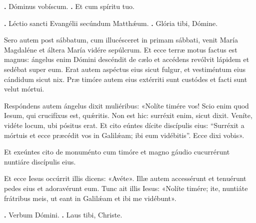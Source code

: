 
\textbf{\Vbar.} Dóminus vobíscum.
\textbf{\Rbar.} Et cum spíritu tuo.

\textbf{\Vbar.} Léctio sancti Evangélii secúndum Matth\'{\ae}um.
\textbf{\Rbar.} Glória tibi, Dómine.

Sero autem post sábbatum, cum illucésceret in primam sábbati, venit María Magdaléne et áltera María
vidére sepúlcrum.
Et ecce terræ motus factus est magnus: ángelus enim Dómini descéndit de cælo et accédens revólvit lápidem et sedébat super eum. 
Erat autem aspéctus eius sicut fulgur, et vestiméntum eius cándidum sicut nix.
Præ timóre autem eius extérriti sunt custódes et facti sunt velut mórtui.

Respóndens autem ángelus dixit muliéribus: «Nolíte timére vos! Scio enim quod Iesum, qui crucifíxus est, qu\'{\ae}ritis.
Non est hic: surréxit enim, sicut dixit.
Veníte, vidéte locum, ubi pósitus erat.
Et cito eúntes dícite discípulis eius: “Surréxit a mórtuis et ecce præcédit vos in Galil\'{\ae}am; ibi eum vidébitis”.
Ecce dixi vobis». 

Et exeúntes cito de monuménto cum timóre et magno gáudio cucurrérunt nuntiáre discípulis eius.

Et ecce Iesus occúrrit illis dicens: «Avéte». Illæ autem accessérunt et tenuérunt pedes eius et adoravérunt eum. 
Tunc ait illis Iesus: «Nolíte timére; ite, nuntiáte frátribus meis, ut eant in Galil\'{\ae}am et ibi me vidébunt».

\textbf{\Vbar.} Verbum Dómini.
\textbf{\Rbar.} Laus tibi, Christe.
\par